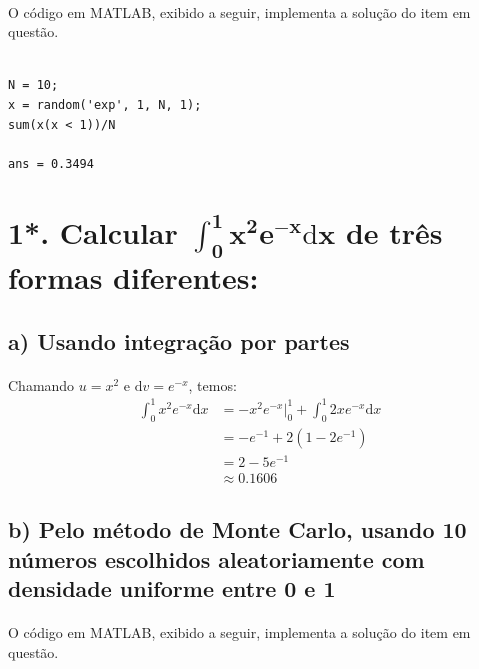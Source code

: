 \documentclass{report}
\begin{document}
\paragraph{} O código em MATLAB, exibido a seguir, implementa a solução do item em questão.

\begin{verbatim}

N = 10; 
x = random('exp', 1, N, 1); 
sum(x(x < 1))/N

ans = 0.3494

\end{verbatim}

\section*{1*. Calcular $\mathbf{\int_0^1 \! x^2e^{-x}\mathrm{d}x}$ de três formas diferentes:}

\subsection*{a) Usando integração por partes}

\paragraph{} Chamando $u = x^2$ e $\mathrm{d}v = e^{-x}$, temos:\\

\begin{equation*}
\begin{split}
\int_0^1 \! x^2e^{-x}\mathrm{d}x & = - x^2e^{-x}\big|_0^1 + \int_0^1 \! 2xe^{-x}\mathrm{d}x \\
& = -e^{-1} + 2(1 - 2e^{-1}) \\
& = 2 - 5e^{-1} \\
& \approx 0.1606
\end{split}
\end{equation*}

\subsection*{b) Pelo método de Monte Carlo, usando 10 números escolhidos aleatoriamente com densidade uniforme entre 0 e 1}

\paragraph{} O código em MATLAB, exibido a seguir, implementa a solução do item em questão.
\end{document}
